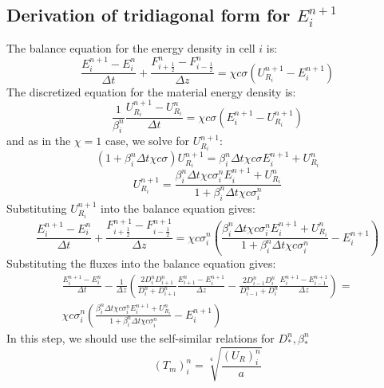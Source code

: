 \documentclass{article}
\begin{document}
\subsection{Derivation of tridiagonal form for $E_i^{n+1}$}
The balance equation for the energy density in cell $i$ is:
\begin{equation}
    \frac{E_i^{n+1} - E_i^n}{\Delta t} + \frac{F_{i+\frac{1}{2}}^{n} - F_{i-\frac{1}{2}}^{n}}{\Delta z} = \chi c \sigma (U_{R_i}^{n+1} - E_i^{n+1})
\end{equation}
The discretized equation for the material energy density is:
\begin{equation}
    \frac{1}{ \beta_i^{n}}\frac{U_{R_i}^{n+1} - U_{R_i}^n}{\Delta t} = \chi c \sigma (E_i^{n+1} - U_{R_i}^{n+1})
\end{equation}
and as in the $\chi = 1$ case, we solve for $U_{R_i}^{n+1}$:
\begin{equation}
    (1 +  \beta_i^{n} \Delta t \chi c \sigma) U_{R_i}^{n+1} =  \beta_i^{n}\Delta t \chi c \sigma E_i^{n+1} + U_{R_i}^n
\end{equation}
\begin{equation}
    \boxed{U_{R_i}^{n+1} = \frac{ \beta_i^{n}\Delta t \chi c \sigma_i^{n} E_i^{n+1} + U_{R_i}^n}{1 +  \beta_i^{n} \Delta t \chi c \sigma_i^{n}}}
\end{equation}
Substituting $U_{R_i}^{n+1}$ into the balance equation gives:
\begin{equation}
    \frac{E_i^{n+1} - E_i^n}{\Delta t} + \frac{F_{i+\frac{1}{2}}^{n+1} - F_{i-\frac{1}{2}}^{n+1}}{\Delta z} = 
    \chi c \sigma_i^{n} \left(\frac{ \beta_i^{n}\Delta t \chi c \sigma_i^{n} E_i^{n+1} + U_{R_i}^n}{1 +  \beta_i^{n} \Delta t \chi c \sigma_i^{n}} - E_i^{n+1}\right)
\end{equation}
Substituting the fluxes into the balance equation gives:
\begin{gather}
    \frac{E_i^{n+1} - E_i^n}{\Delta t} - \frac{1}{\Delta z}\left(\frac{2D_i^{n} D_{i+1}^{n}}{D_i^{n} + D_{i+1}^{n}}\frac{E_{i+1}^{n} - E_i^{n+1}}{\Delta z} - \frac{2D_{i-1}^{n} D_{i}^{n}}{D_{i-1}^{n} + D_{i}^{n}}\frac{E_{i}^{n+1} - E_{i-1}^{n+1}}{\Delta z}\right) = \\
    \chi c \sigma_i^{n} \left(\frac{ \beta_i^{n}\Delta t \chi c \sigma_i^{n} E_i^{n+1} + U_{R_i}^n}{1 +  \beta_i^{n} \Delta t \chi c \sigma_i^{n}} - E_i^{n+1}\right)
\end{gather}
In this step, we should use the self-similar relations for $D_*^n,\beta^n_*$ 
\begin{equation}
    (T_m)^n_i=\sqrt[4]{\frac{(U_R)^n_i}{a}}
\end{equation}
\end{document}

